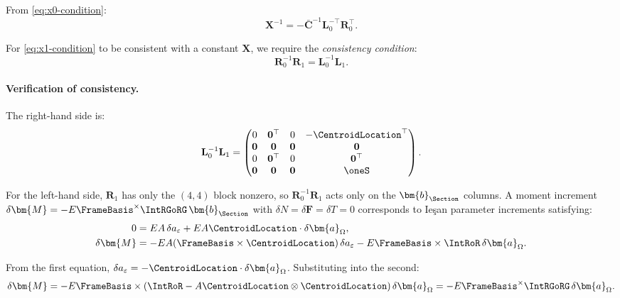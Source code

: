 From \eqref{eq:x0-condition}:
\begin{equation}
\mathbf{X}^{-1} = -\bar{\mathbf{C}}^{-1} \mathbf{L}_0^{-\top} \mathbf{R}_0^\top.
\label{eq:X-inv-formula}
\end{equation}

For \eqref{eq:x1-condition} to be consistent with a constant $\mathbf{X}$, 
we require the \emph{consistency condition}:
\begin{equation}
\mathbf{R}_0^{-1} \mathbf{R}_1 = \mathbf{L}_0^{-1} \mathbf{L}_1.
\label{eq:consistency-condition}
\end{equation}

\paragraph{Verification of consistency.}

The right-hand side is:
\begin{equation}
\mathbf{L}_0^{-1}\mathbf{L}_1 = \begin{pmatrix}
0 & \mathbf{0}^\top & 0 & -\CentroidLocation^\top \\
\mathbf{0} & \mathbf{0} & \mathbf{0} & \mathbf{0} \\
0 & \mathbf{0}^\top & 0 & \mathbf{0}^\top \\
\mathbf{0} & \mathbf{0} & \mathbf{0} & \oneS
\end{pmatrix}.
\end{equation}

For the left-hand side, $\mathbf{R}_1$ has only the $(4,4)$ block nonzero, 
so $\mathbf{R}_0^{-1}\mathbf{R}_1$ acts only on the $\bm{b}_{\Section}$ columns. 
A moment increment $\delta\bm{M} = -E\FrameBasis^\times\IntRGoRG\,\bm{b}_{\Section}$ 
with $\delta N = \delta\bm{F} = \delta T = 0$ corresponds to Ieşan parameter 
increments satisfying:
\begin{align*}
0 &= EA\,\delta a_\varepsilon + EA\CentroidLocation\cdot \delta\bm{a}_\Omega, \\
\delta\bm{M} &= -EA(\FrameBasis \times \CentroidLocation)\,\delta a_\varepsilon 
- E\FrameBasis\times\IntRoR\,\delta\bm{a}_\Omega.
\end{align*}

From the first equation, $\delta a_\varepsilon = -\CentroidLocation\cdot \delta\bm{a}_\Omega$. 
Substituting into the second:
\begin{equation*}
\delta\bm{M} = -E\FrameBasis\times(\IntRoR - A\CentroidLocation \otimes \CentroidLocation)\,\delta\bm{a}_\Omega 
= -E\FrameBasis^\times\IntRGoRG\,\delta\bm{a}_\Omega.
\end{equation*}

